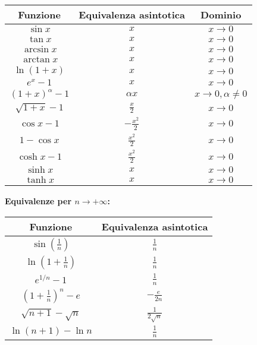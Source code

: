 \begin{enumerate}
\begin{info}
    \begin{center}
    \begin{tabular}{|c|c|c|}
    \hline
    \textbf{Funzione} & \textbf{Equivalenza asintotica} & \textbf{Dominio} \\
    \hline
    $\sin x$ & $x$ & $x \to 0$ \\
    \hline
    $\tan x$ & $x$ & $x \to 0$ \\
    \hline
    $\arcsin x$ & $x$ & $x \to 0$ \\
    \hline
    $\arctan x$ & $x$ & $x \to 0$ \\
    \hline
    $\ln(1+x)$ & $x$ & $x \to 0$ \\
    \hline
    $e^x - 1$ & $x$ & $x \to 0$ \\
    \hline
    $(1+x)^\alpha - 1$ & $\alpha x$ & $x \to 0, \alpha \neq 0$ \\
    \hline
    $\sqrt{1+x} - 1$ & $\frac{x}{2}$ & $x \to 0$ \\
    \hline
    $\cos x - 1$ & $-\frac{x^2}{2}$ & $x \to 0$ \\
    \hline
    $1 - \cos x$ & $\frac{x^2}{2}$ & $x \to 0$ \\
    \hline
    $\cosh x - 1$ & $\frac{x^2}{2}$ & $x \to 0$ \\
    \hline
    $\sinh x$ & $x$ & $x \to 0$ \\
    \hline
    $\tanh x$ & $x$ & $x \to 0$ \\
    \hline
    \end{tabular}
    \end{center}

    \textbf{Equivalenze per $n \to +\infty$:}
    \begin{center}
    \begin{tabular}{|c|c|}
    \hline
    \textbf{Funzione} & \textbf{Equivalenza asintotica} \\
    \hline
    $\sin\left(\frac{1}{n}\right)$ & $\frac{1}{n}$ \\
    \hline
    $\ln\left(1 + \frac{1}{n}\right)$ & $\frac{1}{n}$ \\
    \hline
    $e^{1/n} - 1$ & $\frac{1}{n}$ \\
    \hline
    $\left(1 + \frac{1}{n}\right)^n - e$ & $-\frac{e}{2n}$ \\
    \hline
    $\sqrt{n+1} - \sqrt{n}$ & $\frac{1}{2\sqrt{n}}$ \\
    \hline
    $\ln(n+1) - \ln n$ & $\frac{1}{n}$ \\
    \hline
    \end{tabular}
    \end{center}


\end{info}
\end{enumerate}
